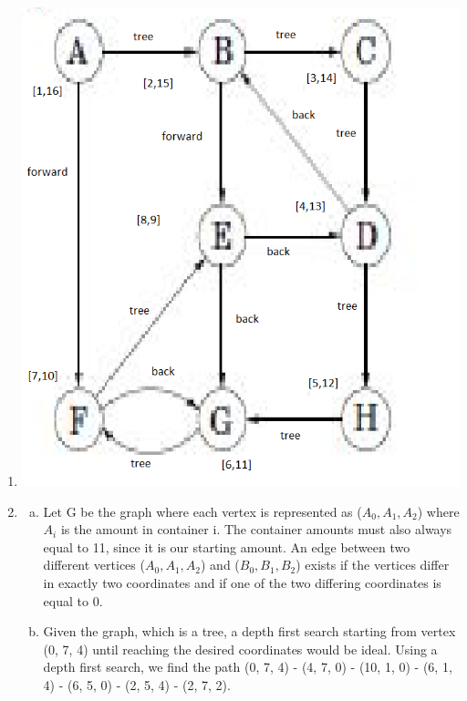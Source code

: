 \documentclass{article}
\begin{document}
\begin{enumerate}
    \item \includegraphics{dfp}

    \clearpage

    \item \begin{enumerate}[(a)]
        \item Let G be the graph where each vertex is represented as ($A_{0}, A_{1}, A_{2}$) where $A_{i}$ is the amount in container i. The container amounts must also always equal to 11,
        since it is our starting amount. An edge between two different vertices ($A_{0}, A_{1}, A_{2}$) and ($B_{0}, B_{1}, B_{2}$) exists if the vertices differ in exactly two coordinates and if one
        of the two differing coordinates is equal to 0.
        \item Given the graph, which is a tree, a depth first search starting from vertex (0, 7, 4) until reaching the desired coordinates would be ideal. Using a depth first search, we find the path
        (0, 7, 4) - (4, 7, 0) - (10, 1, 0) - (6, 1, 4) - (6, 5, 0) - (2, 5, 4) - (2, 7, 2).
    \end{enumerate}
	
\end{enumerate}
\end{document}

